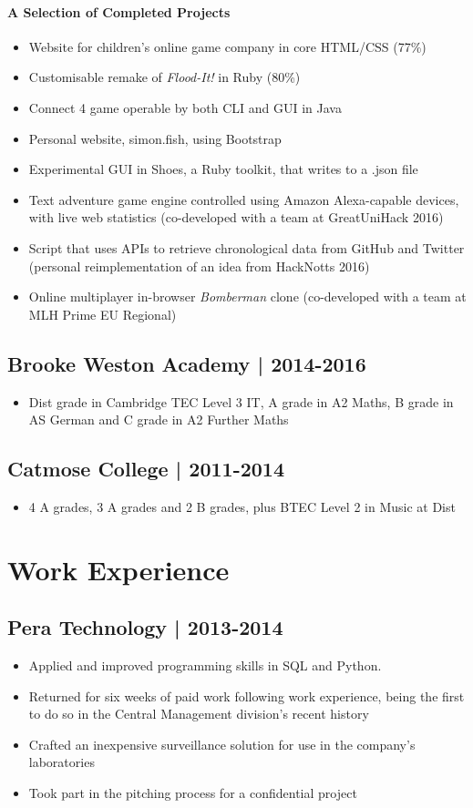 \documentclass{article}
\begin{document}
\paragraph{A Selection of Completed Projects}
\begin{itemize}
	\item Website for children's online game company in core HTML/CSS (77\%)
	\item Customisable remake of \textit{Flood-It!} in Ruby (80\%)
	\item Connect 4 game operable by both CLI and GUI in Java
	\item Personal website, simon.fish, using Bootstrap
	\item Experimental GUI in Shoes, a Ruby toolkit, that writes to a .json file
	\item Text adventure game engine controlled using Amazon Alexa-capable devices, with live web statistics (co-developed with a team at GreatUniHack 2016)
	\item Script that uses APIs to retrieve chronological data from GitHub and Twitter (personal reimplementation of an idea from HackNotts 2016)
	\item Online multiplayer in-browser \textit{Bomberman} clone (co-developed with a team at MLH Prime EU Regional)
\end{itemize}
\subsection*{Brooke Weston Academy | 2014-2016}
\begin{itemize}
	\item Dist\* grade in Cambridge TEC Level 3 IT, A grade in A2 Maths, B grade in AS German and C grade in A2 Further Maths
\end{itemize}
\subsection*{Catmose College | 2011-2014}
\begin{itemize}
	\item 4 A\* grades, 3 A grades and 2 B grades, plus BTEC Level 2 in Music at Dist\*
\end{itemize}
\section*{Work Experience}
\subsection*{Pera Technology | 2013-2014}
\begin{itemize}
	\item Applied and improved programming skills in SQL and Python.
	\item Returned for six weeks of paid work following work experience, being the first to do so in the Central Management division's recent history
	\item Crafted an inexpensive surveillance solution for use in the company's laboratories
	\item Took part in the pitching process for a confidential project
\end{itemize}
\end{document}
